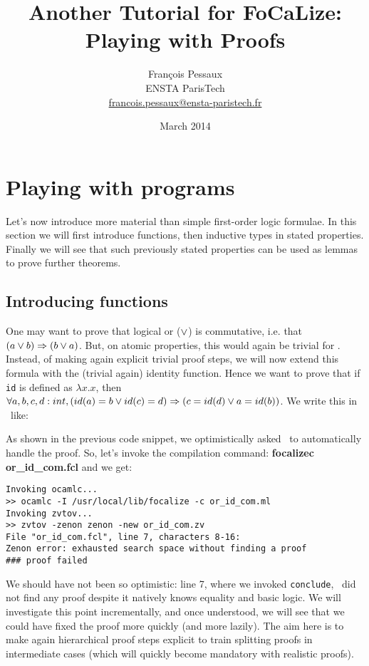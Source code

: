 \documentclass[11pt,a4paper,twoside,onecolumn,fullpage]{article}
\author{Fran\c{c}ois Pessaux\\
  ENSTA ParisTech\\
  \url{francois.pessaux@ensta-paristech.fr}}
\title{Another Tutorial for {F}o{C}a{L}ize:\\
  Playing with Proofs}
\date{March 2014}
\begin{document}
\maketitle




\section{Playing with programs}
Let's now introduce more material than simple first-order logic
formulae. In this section we will first introduce functions, then
inductive types in stated properties. Finally we will see that
such previously stated properties can be used as lemmas to prove further
theorems.

\subsection{Introducing functions}
One may want to prove that logical or ($\vee$) is commutative,
i.e. that $(a \vee b) \Rightarrow (b \vee a)$. But, on atomic
properties, this would again be trivial for \zenon. Instead, of making
again explicit trivial proof steps, we will now extend this formula
with the (trivial again) identity function. Hence we want to prove
that if \verb"id" is defined as $\lambda x.x$, then
$\forall a, b, c, d : int, (id (a) = b \vee id (c) = d) \Rightarrow (c = id (d) \vee a = id (b))$.
We write this in \focal\ like:

{\scriptsize
}

As shown in the previous code snippet, we optimistically asked \zenon\ to
automatically handle the proof. So, let's invoke the compilation
command: \textbf{focalizec or\_id\_com.fcl} and we get:

{\scriptsize
\begin{verbatim}
Invoking ocamlc...
>> ocamlc -I /usr/local/lib/focalize -c or_id_com.ml
Invoking zvtov...
>> zvtov -zenon zenon -new or_id_com.zv
File "or_id_com.fcl", line 7, characters 8-16:
Zenon error: exhausted search space without finding a proof
### proof failed
\end{verbatim}}

We should have not been so optimistic: line 7, where we invoked \lstinline"conclude",
\zenon\ did not find any proof despite it natively knows equality and
basic logic. We will investigate this point incrementally, and once
understood, we will see that we could have fixed the proof more
quickly (and more lazily). The aim here is to make again hierarchical
proof steps explicit to train splitting proofs in intermediate cases
(which will quickly become mandatory with realistic proofs).
\end{document}
